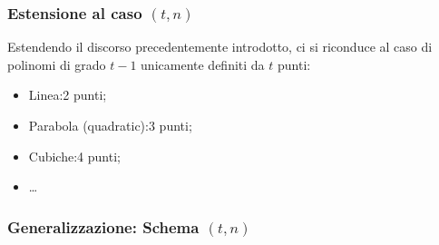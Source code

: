 \documentclass{book}
\theoremstyle{definition}
\begin{document}
\subsubsection{Estensione al caso \((t,n)\)}
Estendendo il discorso precedentemente introdotto, ci si riconduce al caso di polinomi di grado \(t-1\) unicamente definiti da \(t\) punti:
\begin{itemize}
    \item Linea:\@2 punti;
    \item Parabola (quadratic):\@3 punti;
    \item Cubiche:\@4 punti;
    \item \dots
\end{itemize}
\subsubsection{Generalizzazione: Schema \((t,n)\)}
\end{document}
